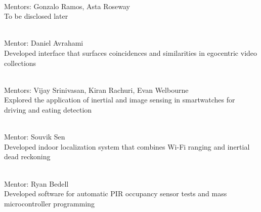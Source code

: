  \\
Mentors: Gonzalo Ramos, Asta Roseway \\
To be disclosed later
\vspace{5pt}

 \\
Mentor: Daniel Avrahami \\
Developed interface that surfaces coincidences and similarities in egocentric video collections
\vspace{5pt}

 \\
Mentors: Vijay Srinivasan, Kiran Rachuri, Evan Welbourne \\
Explored the application of inertial and image sensing in smartwatches for driving and eating detection
\vspace{5pt}

 \\
Mentor: Souvik Sen \\
Developed indoor localization system that combines Wi-Fi ranging and inertial dead reckoning
\vspace{5pt}

 \\
Mentor: Ryan Bedell \\
Developed software for automatic PIR occupancy sensor tests and mass microcontroller programming